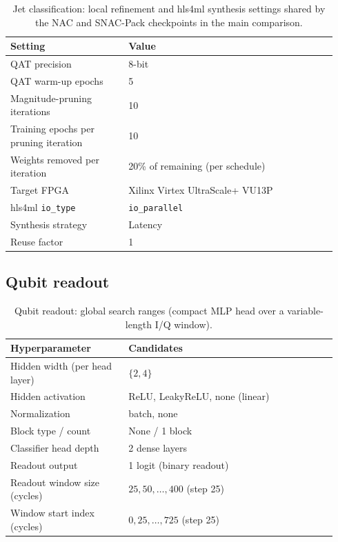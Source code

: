 \documentclass[11pt]{article}
\begin{document}
\begin{table}[t]
  \centering
  \footnotesize
  \caption{Jet classification: local refinement and hls4ml synthesis settings shared by the NAC and SNAC-Pack checkpoints in the main comparison.}
  \label{tab:mlp-local-search-table}
  \begin{tabular}{@{}p{0.34\linewidth}p{0.60\linewidth}@{}}
    \toprule
    \textbf{Setting} & \textbf{Value} \\
    \midrule
    QAT precision & 8-bit \\
    QAT warm-up epochs & 5 \\
    Magnitude-pruning iterations & 10 \\
    Training epochs per pruning iteration & 10 \\
    Weights removed per iteration & 20\% of remaining (per schedule) \\
    Target FPGA & Xilinx Virtex UltraScale+ VU13P \\
    hls4ml \texttt{io\_type} & \texttt{io\_parallel} \\
    Synthesis strategy & Latency \\
    Reuse factor & 1 \\
    \bottomrule
  \end{tabular}
\end{table}

\subsection{Qubit readout}
\label{app:qubit-search-config}

\begin{table}[t]
  \centering
  \footnotesize
  \caption{Qubit readout: global search ranges (compact MLP head over a variable-length I/Q window).}
  \label{tab:qubit-global-parameter-table}
  \begin{tabular}{@{}p{0.34\linewidth}p{0.60\linewidth}@{}}
    \toprule
    \textbf{Hyperparameter} & \textbf{Candidates} \\
    \midrule
    Hidden width (per head layer) & $\{2,4\}$ \\
    Hidden activation & ReLU, LeakyReLU, none (linear) \\
    Normalization & batch, none \\
    Block type / count & None / 1 block \\
    Classifier head depth & 2 dense layers \\
    Readout output & 1 logit (binary readout) \\
    Readout window size (cycles) & $25,50,\ldots,400$ (step 25) \\
    Window start index (cycles) & $0,25,\ldots,725$ (step 25) \\
    \bottomrule
  \end{tabular}
\end{table}
\end{document}
